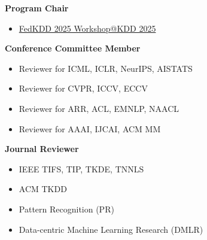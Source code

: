 
\textbf{Program Chair}\par
\begin{itemize}
    \item \href{https://fedkdd.github.io/fedkdd2025/}{FedKDD 2025 Workshop@KDD 2025}
\end{itemize}\par

\textbf{Conference Committee Member}\par
\begin{itemize}
    \item Reviewer for ICML, ICLR, NeurIPS, AISTATS
    \item Reviewer for CVPR, ICCV, ECCV
    \item Reviewer for ARR, ACL, EMNLP, NAACL
    \item Reviewer for AAAI, IJCAI, ACM MM
\end{itemize}\par

\textbf{Journal Reviewer}\par
\begin{itemize}
    \item IEEE TIFS, TIP, TKDE, TNNLS
    \item ACM TKDD
    \item Pattern Recognition (PR)
    \item Data-centric Machine Learning Research (DMLR)
\end{itemize}
